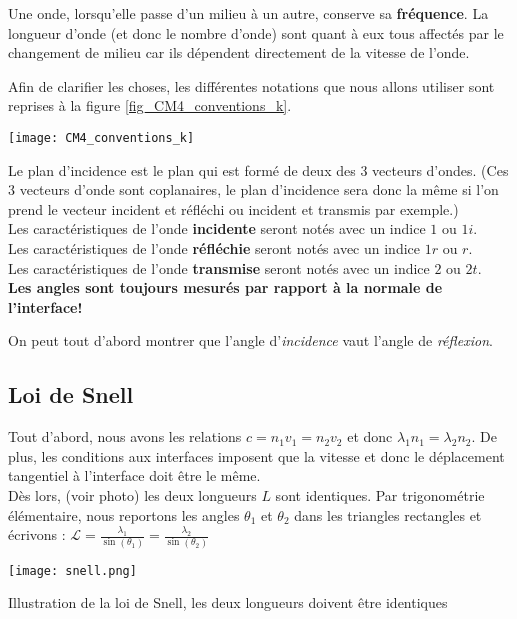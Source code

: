 Une onde, lorsqu'elle passe d'un milieu à un autre, conserve sa \textbf{fréquence}. La longueur d'onde (et donc le nombre d'onde) sont quant à eux tous affectés 
par le changement de milieu car ils dépendent directement de la vitesse de l'onde.


Afin de clarifier les choses, les différentes notations que nous allons utiliser sont reprises à la figure \ref{fig_CM4_conventions_k}.
\begin{marginfigure}
\texttt{[image: CM4\_conventions\_k]}
\caption{Le plan d'incidence est le plan qui est formé de deux des 3 vecteurs d'ondes. (Ces 3 vecteurs d'onde sont coplanaires, le plan d'incidence sera donc la même si l'on prend le vecteur incident et réfléchi ou incident et transmis par exemple.)\\
Les caractéristiques de l'onde \textbf{incidente} seront notés avec un indice $1$ ou $1i$.\\
Les caractéristiques de l'onde \textbf{réfléchie} seront notés avec un indice $1r$ ou $r$. \\
Les caractéristiques de l'onde \textbf{transmise} seront notés avec un indice $2$ ou $2t$. \\
\textbf{Les angles sont toujours mesurés par rapport à la normale de l'interface!}}
\label{fig_CM4_conventions_k}
\end{marginfigure}

On peut tout d'abord montrer que l'angle d'\textit{incidence} vaut l'angle de \textit{réflexion}. 

\subsection{Loi de Snell}

Tout d'abord, nous avons les relations  $c = n_{1} v_{1} = n_{2} v_{2}$ et donc $\lambda_{1} n_{1}= \lambda_{2} n_{2}$.
De plus, les conditions aux interfaces imposent que la vitesse et donc le déplacement tangentiel à l'interface doit être le même. \\
Dès lors, (voir photo) les deux longueurs $L$ sont identiques. Par trigonométrie élémentaire, nous reportons les angles $\theta_{1}$ et $\theta_{2}$ 
dans les triangles rectangles et écrivons : $\mathcal{L} = \frac{\lambda_{1}}{\sin(\theta_{1})} = \frac{\lambda_{2}}{\sin(\theta_{2})}$

\begin{marginfigure}
\texttt{[image: snell.png]}
\caption{Illustration de la loi de Snell, les deux longueurs doivent être identiques}
\end{marginfigure}

